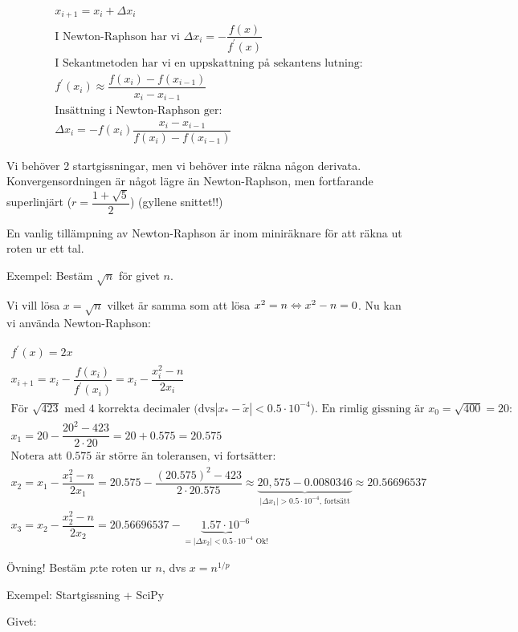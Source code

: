 \begin{equation*}
  \begin{gathered}
    x_{i+1} = x_i+\Delta x_i\\
    \text{I Newton-Raphson har vi } \Delta x_i = -\dfrac{f(x)}{f^{\prime}(x)}\\
    \text{I Sekantmetoden har vi en uppskattning på sekantens lutning:}\\
    f^{\prime}(x_i)\approx \dfrac{f(x_i)-f(x_{i-1})}{x_i-x_{i-1}}\\
    \text{Insättning i Newton-Raphson ger:}\\
    \Delta x_i = -f(x_i)\dfrac{x_i-x_{i-1}}{f(x_i)-f(x_{i-1})}
  \end{gathered}
\end{equation*}
\par\bigskip
\noindent Vi behöver 2 startgissningar, men vi behöver inte räkna någon derivata. Konvergensordningen är något lägre än Newton-Raphson, men fortfarande superlinjärt ($r=\dfrac{1+\sqrt{5}}{2}$) (gyllene snittet!!)
\par\bigskip
\noindent En vanlig tillämpning av Newton-Raphson är inom miniräknare för att räkna ut roten ur ett tal.
\par\bigskip
\noindent Exempel: Bestäm $\sqrt{n}$ för givet $n$.\par
\noindent Vi vill lösa $x=\sqrt{n}$ vilket är samma som att lösa $x^2=n\Leftrightarrow x^2-n=0$. Nu kan vi använda Newton-Raphson:

\begin{equation*}
  \begin{gathered}
    f^{\prime}(x) = 2x\\
    x_{i+1}=x_i-\dfrac{f(x_i)}{f^{\prime}(x_i)}=x_i-\dfrac{x_i^2-n}{2x_i}\\
    \text{För } \sqrt{423}\text{ med 4 korrekta decimaler (dvs} \left|x_*-\tilde{x}\right|<0.5\cdot10^{-4}\text{). En rimlig gissning är $x_0 = \sqrt{400} = 20$:}\\
    x_1 = 20-\dfrac{20^2-423}{2\cdot20}=20+0.575=20.575\\
    \text{Notera att 0.575 är större än toleransen, vi fortsätter:}\\
  x_2 = x_1-\dfrac{x_1^2-n}{2x_1} = 20.575-\dfrac{(20.575)^2-423}{2\cdot20.575}\approx \underbrace{20,575-0.0080346}_{\text{$\left|\Delta x_1\right| > 0.5\cdot10^{-4}$, fortsätt}}\approx 20.56696537\\
  x_3 = x_2 -\dfrac{x_2^2-n}{2x_2} = 20.56696537-\underbrace{1.57\cdot10^{-6}}_{\text{$=\left|\Delta x_2\right|<0.5\cdot10^{-4}$ Ok!}}
  \end{gathered}
\end{equation*}
\par\bigskip
\noindent Övning! Bestäm $p$:te roten ur $n$, dvs $x = n^{1/p}$
\par\bigskip
\noindent Exempel: Startgissning + SciPy\par
\noindent Givet:

